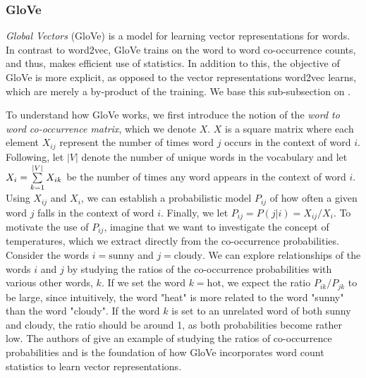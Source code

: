 \subsubsection{GloVe}
\label{sec:glove}
\textit{Global Vectors} (GloVe) \cite{pennington2014glove} is a model for learning vector representations for words. In contrast to word2vec, GloVe trains on the word to word co-occurrence counts, and thus, makes efficient use of statistics. In addition to this, the objective of GloVe is more explicit, as opposed to the vector representations word2vec learns, which are merely a by-product of the training. We base this sub-subsection on \cite{pennington2014glove}.

To understand how GloVe works, we first introduce the notion of the \textit{word to word co-occurrence matrix}, which we denote $X$. $X$ is a square matrix where each element $X_{ij}$ represent the number of times word $j$ occurs in the context of word $i$. Following, let $|V|$ denote the number of unique words in the vocabulary and let $X_i=\sum\limits_{k=1}^{|V|} X_{ik}$ be the number of times any word appears in the context of word $i$. Using $X_{ij}$ and $X_i$, we can establish a probabilistic model $P_{ij}$ of how often a given word $j$ falls in the context of word $i$. Finally, we let $P_{ij}=P(j|i)=X_{ij} / {X_i}$. To motivate the use of $P_{ij}$, imagine that we want to investigate the concept of temperatures, which we extract directly from the co-occurrence probabilities. Consider the words $i = \text{sunny}$ and $j = \text{cloudy}$. We can explore relationships of the words $i$ and $j$ by studying the ratios of the co-occurrence probabilities with various other words, $k$. If we set the word $k = \text{hot}$, we expect the ratio $P_{ik} / P_{jk}$ to be large, since intuitively, the word "heat" is more related to the word "sunny" than the word "cloudy". If the word $k$ is set to an unrelated word of both sunny and cloudy, the ratio should be around 1, as both probabilities become rather low. The authors of \cite{pennington2014glove} give an example of studying the ratios of co-occurrence probabilities and is the foundation of how GloVe incorporates word count statistics to learn vector representations.

